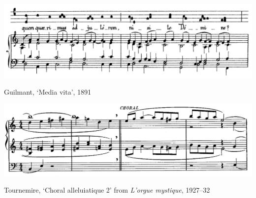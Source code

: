 \vspace*{\fill}

\begin{example}
  \centering
  \includegraphics[width=\linewidth]{c/3/ex/guilmant_media_15.jpg}
  \caption{Guilmant, `Media vita', 1891}
  \label{mus:guilmant_media_15}
\end{example}

\vspace*{\fill}

\begin{example}
  \centering
  \includegraphics[width=\linewidth]{c/3/ex/tournemire_alleluiatique_9.png}
  \caption{Tournemire, `Choral alleluiatique \textnumero{} 2' from \emph{L'orgue mystique}, 1927--32}
  \label{mus:tournemire_alleluiatique_9}
\end{example}

\vspace*{\fill}


\clearpage
